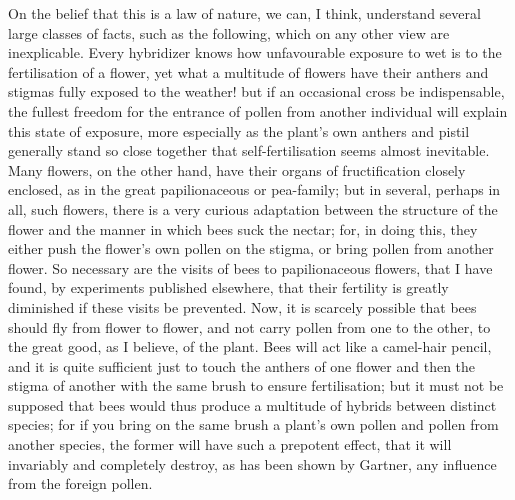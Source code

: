 On the belief that this is a law of nature, we can, I think, understand several large classes of facts, such as the following, which on any other view are inexplicable. Every hybridizer knows how unfavourable exposure to wet is to the fertilisation of a flower, yet what a multitude of flowers have their anthers and stigmas fully exposed to the weather! but if an occasional cross be indispensable, the fullest freedom for the entrance of pollen from another individual will explain this state of exposure, more especially as the plant's own anthers and pistil generally stand so close together that self-fertilisation seems almost inevitable. Many flowers, on the other hand, have their organs of fructification closely enclosed, as in the great papilionaceous or pea-family; but in several, perhaps in all, such flowers, there is a very curious adaptation between the structure of the flower and the manner in which bees suck the nectar; for, in doing this, they either push the flower's own pollen on the stigma, or bring pollen from another flower. So necessary are the visits of bees to papilionaceous flowers, that I have found, by experiments published elsewhere, that their fertility is greatly diminished if these visits be prevented. Now, it is scarcely possible that bees should fly from flower to flower, and not carry pollen from one to the other, to the great good, as I believe, of the plant. Bees will act like a camel-hair pencil, and it is quite sufficient just to touch the anthers of one flower and then the stigma of another with the same brush to ensure fertilisation; but it must not be supposed that bees would thus produce a multitude of hybrids between distinct species; for if you bring on the same brush a plant's own pollen and pollen from another species, the former will have such a prepotent effect, that it will invariably and completely destroy, as has been shown by Gartner, any influence from the foreign pollen.
